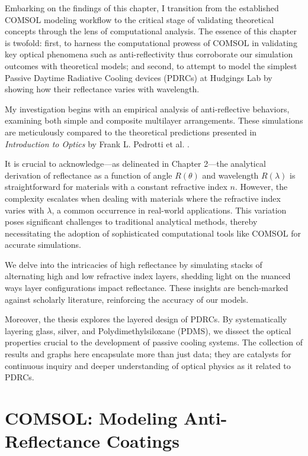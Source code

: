 Embarking on the findings of this chapter, I transition from the established COMSOL modeling workflow to the critical stage of validating theoretical concepts through the lens of computational analysis. The essence of this chapter is twofold: first, to harness the computational prowess of COMSOL in validating key optical phenomena such as anti-reflectivity thus corroborate our simulation outcomes with theoretical models; and second, to attempt to model the simplest Passive Daytime Radiative Cooling devices (PDRCs) at Hudgings Lab by showing how their reflectance varies with wavelength.

My investigation begins with an empirical analysis of anti-reflective behaviors, examining both simple and composite multilayer arrangements. These simulations are meticulously compared to the theoretical predictions presented in \emph{Introduction to Optics} by Frank L. Pedrotti et al. \cite{pedrotti_introduction_2007}.

It is crucial to acknowledge—as delineated in Chapter 2—the analytical derivation of reflectance as a function of angle $R(\theta)$ and wavelength $R(\lambda)$ is straightforward for materials with a constant refractive index $n$. However, the complexity escalates when dealing with materials where the refractive index varies with $\lambda$, a common occurrence in real-world applications. This variation poses significant challenges to traditional analytical methods, thereby necessitating the adoption of sophisticated computational tools like COMSOL for accurate simulations.

We delve into the intricacies of high reflectance by simulating stacks of alternating high and low refractive index layers, shedding light on the nuanced ways layer configurations impact reflectance. These insights are bench-marked against scholarly literature, reinforcing the accuracy of our models.

Moreover, the thesis explores the layered design of PDRCs. By systematically layering glass, silver, and Polydimethylsiloxane (PDMS), we dissect the optical properties crucial to the development of passive cooling systems. The collection of results and graphs here encapsulate more than just data; they are catalysts for continuous inquiry and deeper understanding of optical physics as it related to PDRCs.


\section{COMSOL: Modeling Anti-Reflectance Coatings}

